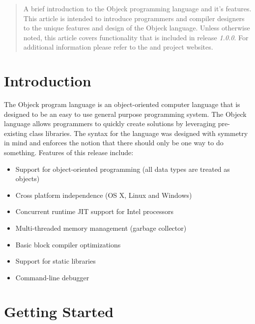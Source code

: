 \documentclass[12pt]{article}
\begin{document}
\maketitle
\thispagestyle{empty}

\vspace{\baselineskip}

\begin{abstract}
A brief introduction to the Objeck programming language and it's features.  This article is intended to introduce programmers and compiler designers to the unique features and design of the Objeck language.   Unless otherwise noted, this article covers functionality that is included in release \textit{1.0.0}.  For additional information please refer to the  and  project websites.
\end{abstract}

\newpage
\tableofcontents
\newpage

\label{Introduction}
\section{Introduction}
The Objeck program language is an object-oriented computer language that is designed to be an easy to use general purpose programming system.  The Objeck language allows programmers to quickly create solutions by leveraging pre-existing class libraries.  The syntax for the language was designed with symmetry in mind and enforces the notion that there should only be one way to do something. Features of this release include:
\begin{itemize}
	\item Support for object-oriented programming (all data types are treated as objects)
	\item Cross platform independence (OS X, Linux and Windows)
	\item Concurrent runtime JIT support for Intel processors
	\item Multi-threaded memory management (garbage collector)
	\item Basic block compiler optimizations
	\item Support for static libraries
	\item Command-line debugger
\end{itemize}

\section{Getting Started}
\end{document}
